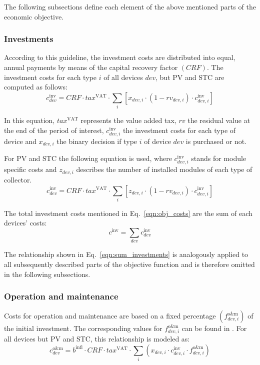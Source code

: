 The following subsections define each element of the above mentioned parts of the economic objective.

\subsubsection{Investments}

According to this guideline, the investment costs are distributed into equal, annual payments by means of the capital recovery factor $\left(CRF\right)$.
The investment costs for each type $i$ of all devices $dev$, but PV and STC are computed as follows:
\begin{equation}
	c^\mathrm{inv}_{dev} = CRF \cdot tax^\mathrm{VAT} \cdot \sum\limits_{i} \left[ x_{dev,i} \cdot \left(1-rv_{dev,i}\right) \cdot c^\mathrm{inv}_{dev,i} \right]
\end{equation}

In this equation, $tax^\mathrm{VAT}$ represents the value added tax, $rv$ the residual value at the end of the period of interest, $c^\mathrm{inv}_{dev,i}$ the investment costs for each type of device and $x_{dev,i}$ the binary decision if type $i$ of device $dev$ is purchased or not.

For PV and STC the following equation is used, where $c^\mathrm{inv}_{dev,i}$ stands for module specific costs and $z_{dev,i}$ describes the number of installed modules of each type of collector.
\begin{equation}
	c^\mathrm{inv}_{dev} = CRF \cdot tax^\mathrm{VAT} \cdot \sum\limits_{i} \left[ z_{dev,i} \cdot \left(1-rv_{dev,i}\right) \cdot c^\mathrm{inv}_{dev,i} \right]
\end{equation}

The total investment costs mentioned in Eq.~\ref{eqn:obj_costs} are the sum of each devices' costs:
\begin{equation}
	c^\mathrm{inv} = \sum\limits_{dev} c^\mathrm{inv}_{dev}
	\label{eqn:sum_investments}
\end{equation}

The relationship shown in Eq.~\ref{eqn:sum_investments} is analogously applied to all subsequently described parts of the objective function and is therefore omitted in the following subsections.


\subsubsection{Operation and maintenance}

Costs for operation and maintenance are based on a fixed percentage $\left(f^{\mathrm{o\&m}}_{dev,i}\right)$ of the initial investment.
The corresponding values for $f^{\mathrm{o\&m}}_{dev,i}$ can be found in \cite{VDI_2067}.
For all devices but PV and STC, this relationship is modeled as:
\begin{equation}
	c^\mathrm{o\&m}_{dev} = b^{\mathrm{infl}} \cdot CRF \cdot tax^\mathrm{VAT} \cdot \sum\limits_{i} \left( x_{dev,i} \cdot c^\mathrm{inv}_{dev,i} \cdot f^{\mathrm{o\&m}}_{dev,i} \right)
	\label{eqn:costs_om_nonpvstc}
\end{equation}


